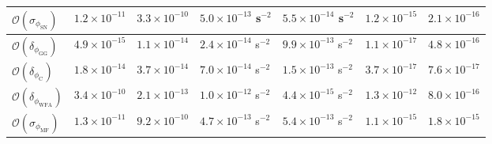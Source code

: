 \begin{tabular}[]{@{}l|ll|ll|ll@{}}
$\mathcal{O}(\sigma_{\phi_\text{SN}})$                              & $1.2\times 10^{-11}$ & $3.3\times 10^{-10}$ & $5.0\times 10^{-13}$ s$^{-2}$    & $5.5\times 10^{-14}$ s$^{-2}$   & $1.2\times 10^{-15}$             & $2.1\times 10^{-16}$   \\ \midrule
$\mathcal{O}(\delta_{\phi_\text{GG}})$                              & $4.9\times 10^{-15}$ & $1.1\times 10^{-14}$ & $2.4\times 10^{-14}$ s$^{-2}$    & $9.9\times 10^{-13}$ s$^{-2}$   & $1.1\times 10^{-17}$             & $4.8\times 10^{-16}$   \\
$\mathcal{O}(\delta_{\phi_\text{C}})$                               & $1.8\times 10^{-14}$ & $3.7\times 10^{-14}$ & $7.0\times 10^{-14}$ s$^{-2}$    & $1.5\times 10^{-13}$ s$^{-2}$   & $3.7\times 10^{-17}$             & $7.6\times 10^{-17}$   \\
$\mathcal{O}(\delta_{\phi_\text{WFA}})$                             & $3.4\times 10^{-10}$ & $2.1\times 10^{-13}$ & $1.0\times 10^{-12}$ s$^{-2}$    & $4.4\times 10^{-15}$ s$^{-2}$   & $1.3\times 10^{-12}$             & $8.0\times 10^{-16}$   \\
$\mathcal{O}(\sigma_{\phi_\text{MF}})$                              & $1.3\times 10^{-11}$ & $9.2\times 10^{-10}$ & $4.7\times 10^{-13}$ s$^{-2}$    & $5.4\times 10^{-13}$ s$^{-2}$   & $1.1\times 10^{-15}$             & $1.8\times 10^{-15}$   \\ \bottomrule
\end{tabular}
%
%